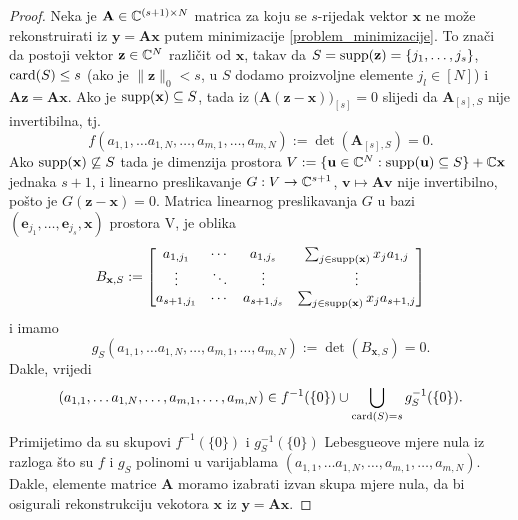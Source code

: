 \documentclass[a4paper,twoside,12pt]{memoir} %
\newcommand{\vect}[1]{\mathbf{#1}}
\renewcommand{\vec}{\vect}
\newcommand{\card}{\text{\normalfont{card}}}
\newcommand{\supp}{\text{\normalfont{supp}}}
\newcommand{\norm}[1]{\|{#1}\|}
\begin{document}
\begin{proof}
    Neka je $\vec A \in \C^{(s+1) \times N}$ matrica za koju se $s$-rijedak vektor $\vec x$ ne mo\v{z}e rekonstruirati iz $\vec y = \vec{Ax}$ putem minimizacije \eqref{problem_minimizacije}. To zna\v{c}i da postoji vektor $\vec z \in \C^N$ razli\v{c}it od $\vec x$, takav da $S=\supp(\vec z)=\{j_1, \dots, j_s\}$, $\card(S) \leq s$ (ako je $\norm{\vec z}_0 < s$, u $S$ dodamo proizvoljne elemente $j_l \in [N]$) i $\vec{Az}=\vec{Ax}$. Ako je $\supp(\vec x) \subseteq S$, tada iz $\big( \vec A (\vec z - \vec x)  \big)_{[s]}=0$ slijedi da $\vec A_{[s], S}$ nije invertibilna, tj.
    \begin{equation*}
        f(a_{1,1}, \dots a_{1,N}, \dots, a_{m,1}, \dots, a_{m,N}) := \det(\vec A_{[s], S}) = 0.
    \end{equation*}
    Ako $\supp(\vec x) \not\subseteq S$ tada je dimenzija prostora $V:=\{ \vec u \in \C^N: \supp(\vec u ) \subseteq S \} + \C \vec x$ jednaka $s+1$, i linearno preslikavanje $G:V \rightarrow \mathbb{C}^{s+1}$, $\vec v \mapsto \vec{Av}$ nije invertibilno, po\v{s}to je $G(\vec z - \vec x)=0$. Matrica linearnog preslikavanja $G$ u bazi $(\vec e_{j_1}, \dots, \vec e_{j_s}, \vec x)$ prostora V, je oblika
    \begin{equation*}
        B_{\vec x, S}:=
        \begin{bmatrix*}
            a_{1, j_1} & \cdots & a_{1,j_s} & \sum_{j \in \supp(\vec x)}x_j a_{1,j} \\
            \vdots & \ddots & \vdots & \vdots \\
            a_{s+1, j_1} & \cdots & a_{s+1,j_s} & \sum_{j \in \supp(\vec x)}x_j a_{s+1,j}
        \end{bmatrix*}
    \end{equation*}
    i imamo
    \begin{equation*}
        g_S(a_{1,1}, \dots a_{1,N}, \dots, a_{m,1}, \dots, a_{m,N}) := \det (B_{\vec x, S})=0.
    \end{equation*}
    Dakle, vrijedi
    \begin{equation*}
        (a_{1,1}, \dots a_{1,N}, \dots, a_{m,1}, \dots, a_{m,N}) \in f^{-1}(\{0\}) \cup \bigcup \limits_{\card(S)=s}g_S^{-1}(\{0\}).
    \end{equation*}
    Primijetimo da su skupovi $f^{-1}(\{0\})$ i $g^{-1}_S(\{0\})$ Lebesgueove mjere nula iz razloga \v{s}to su $f$ i $g_S$ polinomi u varijablama $(a_{1,1}, \dots a_{1,N}, \dots, a_{m,1}, \dots, a_{m,N})$. Dakle, elemente matrice $\vec A$ moramo izabrati izvan skupa mjere nula, da bi osigurali rekonstrukciju vekotora $\vec x$ iz $\vec y = \vec{Ax}$.
\end{proof}
\end{document}
